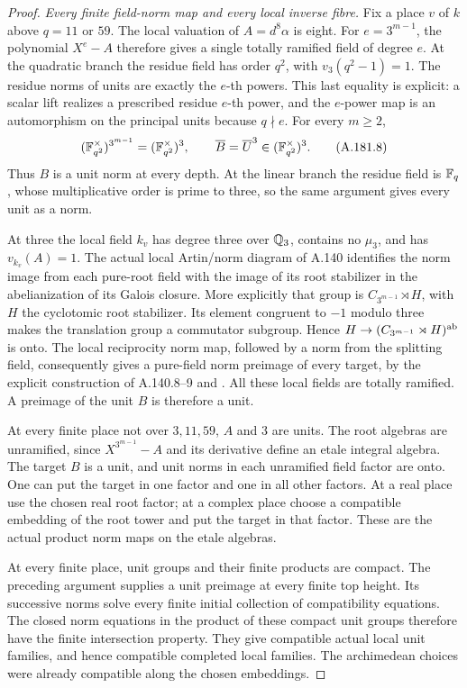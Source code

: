 \begin{proof}
\emph{Every finite field-norm map and every local inverse fibre.}
Fix a place \(v\) of \(k\) above \(q=11\) or \(59\).
The local valuation of \(A=d^8\alpha\) is eight.  For
\(e=3^{m-1}\), the polynomial \(X^e-A\) therefore gives a
single totally ramified field of degree \(e\).  At the quadratic
branch the residue field has order \(q^2\), with
\(v_3(q^2-1)=1\).  The residue norms of units are exactly
the \(e\)-th powers.  This last equality is explicit: a scalar
lift realizes a prescribed residue \(e\)-th power, and the
\(e\)-power map is an automorphism on the principal units because
\(q\nmid e\).  For every \(m\ge2\),
\[
 (\mathbb F_{q^2}^{\times})^{3^{m-1}}
       =(\mathbb F_{q^2}^{\times})^3,
       \qquad \overline B=\overline U^3
                  \in(\mathbb F_{q^2}^{\times})^3.
\tag{A.181.8}
\]
Thus \(B\) is a unit norm at every depth.  At the linear branch
the residue field is \(\mathbb F_q\), whose multiplicative order is
prime to three, so the same argument gives every unit as a norm.

At three the local field \(k_v\) has degree three over
\(\mathbb Q_3\), contains no \(\mu_3\), and has
\(v_{k_v}(A)=1\).  The actual local Artin/norm diagram of
A.140 identifies the norm image from each pure-root field with
the image of its root stabilizer in the abelianization of its
Galois closure.  More explicitly that group is
\(C_{3^{m-1}}\rtimes H\), with \(H\) the cyclotomic
root stabilizer.  Its element congruent to \(-1\) modulo three
makes the translation group a commutator subgroup.  Hence
\(H\to(C_{3^{m-1}}\rtimes H)^{\rm ab}\) is onto.
The local reciprocity norm map, followed by a norm from the
splitting field, consequently gives a pure-field norm preimage
of every target, by the explicit construction of A.140.8--9
and \cite[III, Theorem 3.5]{MilneCFT}.
All these local fields are totally ramified.  A preimage of the
unit \(B\) is therefore a unit.

At every finite place not over \(3,11,59\), \(A\) and
\(3\) are units.  The root algebras are unramified, since
\(X^{3^{m-1}}-A\) and its derivative define an etale integral
algebra.  The target \(B\) is a unit, and unit norms in each
unramified field factor are onto.  One can put the target in one
factor and one in all other factors.  At a real place use the
chosen real root factor; at a complex place choose a compatible
embedding of the root tower and put the target in that factor.
These are the actual product norm maps on the etale algebras.

At every finite place, unit groups and their finite products are
compact.  The preceding argument supplies a unit preimage at
every finite top height.  Its successive norms solve every
finite initial collection of compatibility equations.  The
closed norm equations in the product of these compact unit
groups therefore have the finite intersection property.
They give compatible actual local unit families, and hence
compatible completed local families.  The archimedean choices
were already compatible along the chosen embeddings.


\end{proof}
